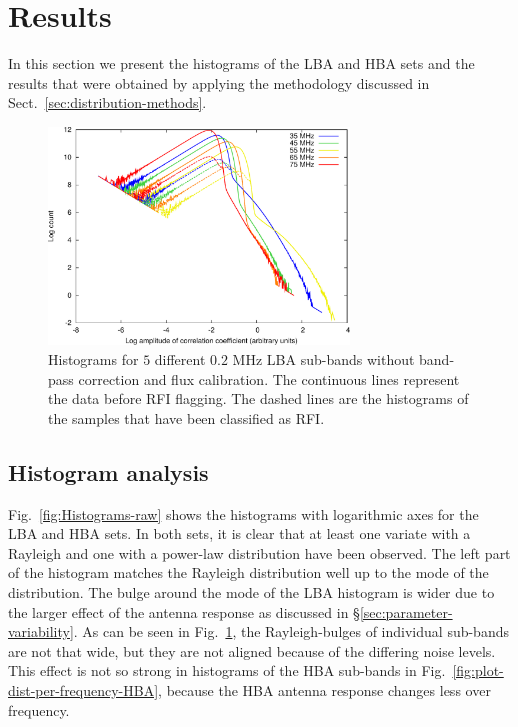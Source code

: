 \documentclass[useAMS,usenatbib]{mn2e}
\begin{document}
\section{Results} \label{sec:dist-results}
In this section we present the histograms of the LBA and HBA sets and the results that were obtained by applying the methodology discussed in Sect.~\ref{sec:distribution-methods}. 

\begin{figure}
\begin{center}
\includegraphics[width=8cm]{img/plot-lba-dist-per-frequency-trimmed}
\caption{Histograms for $5$ different $0.2$ MHz LBA sub-bands without band-pass correction and flux calibration. The continuous lines represent the data before RFI flagging. The dashed lines are the histograms of the samples that have been classified as RFI.}
\label{fig:plot-dist-per-frequency-LBA}
\end{center}
\end{figure}

\subsection{Histogram analysis}
Fig.~\ref{fig:Histograms-raw} shows the histograms with logarithmic axes for the LBA and HBA sets. In both sets, it is clear that at least one variate with a Rayleigh and one with a power-law distribution have been observed. The left part of the histogram matches the Rayleigh distribution well up to the mode of the distribution. The bulge around the mode of the LBA histogram is wider due to the larger effect of the antenna response as discussed in \S\ref{sec:parameter-variability}. As can be seen in Fig.~\ref{fig:plot-dist-per-frequency-LBA}, the Rayleigh-bulges of individual sub-bands are not that wide, but they are not aligned because of the differing noise levels. This effect is not so strong in histograms of the HBA sub-bands in Fig.~\ref{fig:plot-dist-per-frequency-HBA}, because the HBA antenna response changes less over frequency.
\end{document}
